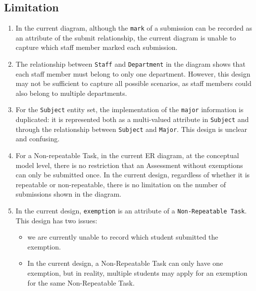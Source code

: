 \documentclass[a4paper,12pt]{article}
\begin{document}
\subsection*{Limitation}
    \begin{enumerate}
        \item In the current diagram, although the \texttt{mark} of a submission can be recorded as an attribute of the submit relationship, the current diagram is unable to capture which staff member marked each submission.
        
        \item The relationship between \texttt{Staff} and \texttt{Department} in the diagram shows that each staff member must belong to only one department. However, this design may not be sufficient to capture all possible scenarios, as staff members could also belong to multiple departments.

        \item For the \texttt{Subject} entity set, the implementation of the \texttt{major} information is duplicated: it is represented both as a multi-valued attribute in \texttt{Subject} and through the relationship between \texttt{Subject} and \texttt{Major}. This design is unclear and confusing.

        \item For a Non-repeatable Task, in the current ER diagram, at the conceptual model level, there is no restriction that an Assessment without exemptions can only be submitted once. In the current design, regardless of whether it is repeatable or non-repeatable, there is no limitation on the number of submissions shown in the diagram.

        \item In the current design, \texttt{exemption} is an attribute of a \texttt{Non-Repeatable Task}. This design has two issues: 
        \begin{itemize}
            \item we are currently unable to record which student submitted the exemption. 
            \item In the current design, a Non-Repeatable Task can only have one exemption, but in reality, multiple students may apply for an exemption for the same Non-Repeatable Task.
        \end{itemize}

    \end{enumerate}
\end{document}
